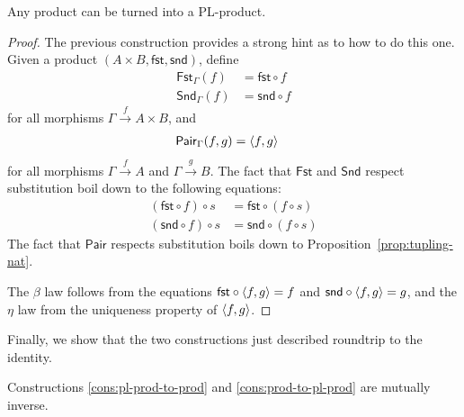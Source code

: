 \begin{construction} \label{cons:prod-to-pl-prod}
  Any product can be turned into a PL-product.
\end{construction}
\begin{proof}
  The previous construction provides a strong hint as to how to do this one.
  Given a product \((A\times B, \mathsf{fst}, \mathsf{snd})\), define
  \begin{align*}
    \mathsf{Fst}_\Gamma(f) &= \mathsf{fst} \circ f \\
    \mathsf{Snd}_\Gamma(f) &= \mathsf{snd} \circ f
  \end{align*}
  for all morphisms \(\Gamma \xrightarrow{f} A \times B\),
  and
  \begin{align*}
    \mathsf{Pair}_\Gamma(f,g) &= \langle f,g\rangle
  \end{align*}
  for all morphisms \(\Gamma\xrightarrow{f} A\) and \(\Gamma\xrightarrow{g} B\).
  The fact that \(\mathsf{Fst}\) and \(\mathsf{Snd}\) respect substitution boil down to the following equations:
  \begin{align*}
    (\mathsf{fst} \circ f) \circ s &= \mathsf{fst} \circ (f \circ s)  \\
    (\mathsf{snd} \circ f) \circ s &= \mathsf{snd} \circ (f \circ s)
  \end{align*}
  The fact that \(\mathsf{Pair}\) respects substitution boils down to Proposition~\ref{prop:tupling-nat}.

  The \(\beta\) law follows from the equations \(\mathsf{fst} \circ \langle f,g\rangle = f\)
  and \(\mathsf{snd} \circ \langle f,g\rangle = g\),
  and the \(\eta\) law from the uniqueness property of \(\langle f,g\rangle\).
\end{proof}

Finally, we show that the two constructions just described roundtrip to the identity.

\begin{proposition}
 Constructions
 \ref{cons:pl-prod-to-prod}
 and
 \ref{cons:prod-to-pl-prod}
 are mutually inverse.
\end{proposition}

